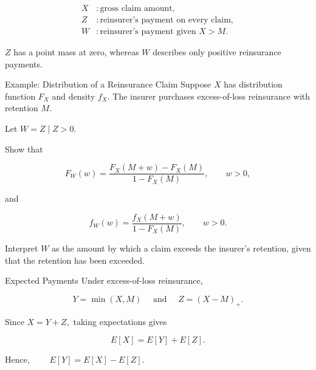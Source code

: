 \documentclass[
  ignorenonframetext,
  aspectratio=169,
]{beamer}
\begin{document}
\begin{frame}
\begin{tcolorbox}[enhanced jigsaw, arc=.35mm, bottomrule=.15mm, bottomtitle=1mm, breakable, colback=white, colbacktitle=quarto-callout-note-color!10!white, colframe=quarto-callout-note-color-frame, coltitle=black, left=2mm, leftrule=.75mm, opacityback=0, opacitybacktitle=0.6, rightrule=.15mm, title=\textcolor{quarto-callout-note-color}{\faInfo}\hspace{0.5em}{Three quantities to distinguish}, titlerule=0mm, toprule=.15mm, toptitle=1mm]

\[
\begin{aligned}
X &: \text{gross claim amount},\\
Z &: \text{reinsurer's payment on every claim},\\
W &: \text{reinsurer's payment given }X>M.
\end{aligned}
\]

\(Z\) has a point mass at zero, whereas \(W\) describes only positive
reinsurance payments.

\end{tcolorbox}
\end{frame}

\begin{frame}{Example: Distribution of a Reinsurance Claim}
\protect{}\label{example-distribution-of-a-reinsurance-claim}
Suppose \(X\) has distribution function \(F_X\) and density \(f_X\). The
insurer purchases excess-of-loss reinsurance with retention \(M\).

Let \(W=Z\mid Z>0.\)

Show that

\[
F_W(w)
=
\frac{F_X(M+w)-F_X(M)}
{1-F_X(M)},
\qquad w>0,
\]

and

\[
f_W(w)
=
\frac{f_X(M+w)}
{1-F_X(M)},
\qquad w>0.
\]

Interpret \(W\) as the amount by which a claim exceeds the insurer's
retention, given that the retention has been exceeded.
\end{frame}

\begin{frame}{Expected Payments}
\protect{}\label{expected-payments-1}
Under excess-of-loss reinsurance,

\[
Y=\min(X,M)  \quad \text{ and } \quad   Z=(X-M)_+.
\]

Since \(X=Y+Z,\) taking expectations gives

\[
\boxed{
E[X]=E[Y]+E[Z].
}
\]

Hence, \(\quad \quad \boxed{E[Y]=E[X]-E[Z].}\)
\end{frame}
\end{document}
